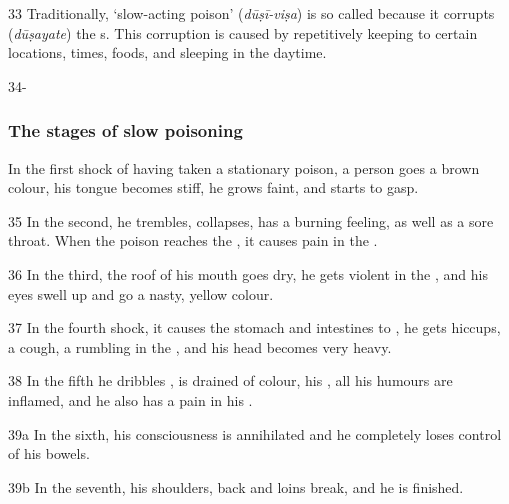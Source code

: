 \begin{translation}
    
    \item[33]
    Traditionally, `slow-acting poison' (\emph{dūṣī-viṣa}) is so called because
    it corrupts (\emph{dūṣayate}) the s.  This
    corruption is caused by repetitively keeping to certain locations, times,
    foods, and sleeping in the daytime.
    
    \item[34-]
    \subsubsection{The stages of slow poisoning}
    In the first shock of having taken a stationary poison, a person goes a
    brown colour, his tongue becomes stiff, he grows faint, and starts to gasp.
    \item[35]
    In the second, he trembles, collapses, has a burning feeling, as well as a
    sore throat.  When the poison reaches the , it causes
    pain in the .
    \item[36]
    In the third, the roof of his mouth goes dry, he gets violent  in the , and his eyes swell up and go 
        a
    nasty, yellow colour.
    \item[37]
    In the fourth shock, it causes the stomach and intestines to
    , he gets hiccups, a cough,  a rumbling in the
    , and his head becomes very heavy.
    \item[38]
    In the fifth he dribbles , is drained of colour,
    his ,  all his humours are inflamed, and he
    also has a pain in his .
    \item[39a]
    In the sixth, his consciousness is annihilated and he completely loses
    control of his bowels.
    \item[39b]
    In the seventh, his shoulders, back and loins break, and he is finished.
    
    

\end{translation}
